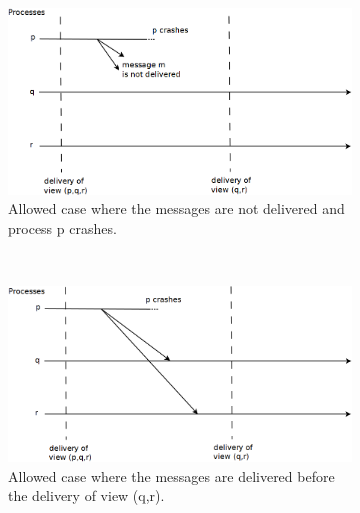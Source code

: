 \begin{figure}
        \centering
        \begin{subfigure}[t]{0.4\textwidth}
                                        \centering
                                        \includegraphics[width=\textwidth]{img/viewsynchronousgroupcommunication_a}
                                        \caption{Allowed case where the messages are not delivered and process p crashes.}
                                        \label{figure:viewsynchronousgroupcommunication:a}
        \end{subfigure}%
        ~
        \begin{subfigure}[t]{0.4\textwidth}
                                        \centering
                                        \includegraphics[width=\textwidth]{img/viewsynchronousgroupcommunication_b}
                                        \caption{Allowed case where the messages are delivered before the delivery of view (q,r).}
                                        \label{figure:viewsynchronousgroupcommunication:b}
        \end{subfigure}
        ~
        \begin{subfigure}[t]{0.4\textwidth}

\end{subfigure}
\end{figure}
